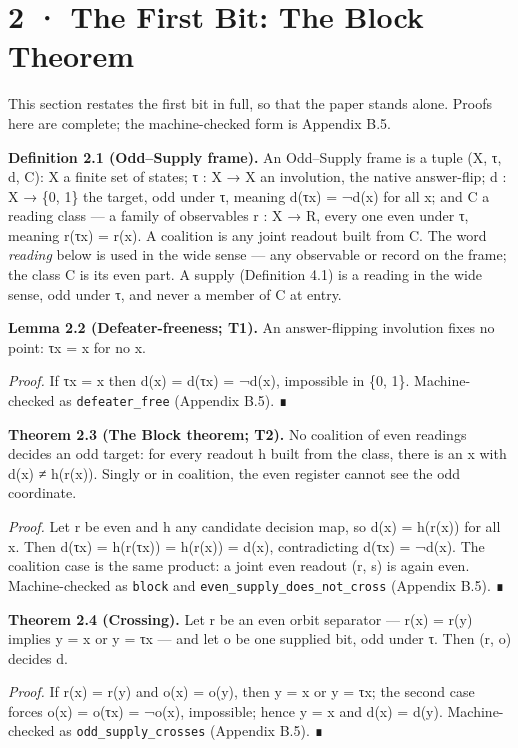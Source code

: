 \documentclass[10pt,twocolumn]{article}
\begin{document}
\section{2 · The First Bit: The Block
Theorem}\label{the-first-bit-the-block-theorem}

This section restates the first bit in full, so that the paper stands
alone. Proofs here are complete; the machine-checked form is Appendix
B.5.

\textbf{Definition 2.1 (Odd--Supply frame).} An Odd--Supply frame is a
tuple (X, τ, d, C): X a finite set of states; τ : X → X an involution,
the native answer-flip; d : X → \{0, 1\} the target, odd under τ,
meaning d(τx) = ¬d(x) for all x; and C a reading class --- a family of
observables r : X → R, every one even under τ, meaning r(τx) = r(x). A
coalition is any joint readout built from C. The word \emph{reading}
below is used in the wide sense --- any observable or record on the
frame; the class C is its even part. A supply (Definition 4.1) is a
reading in the wide sense, odd under τ, and never a member of C at
entry.

\textbf{Lemma 2.2 (Defeater-freeness; T1).} An answer-flipping
involution fixes no point: τx = x for no x.

\emph{Proof.} If τx = x then d(x) = d(τx) = ¬d(x), impossible in \{0,
1\}. Machine-checked as \texttt{defeater\_free} (Appendix B.5). ∎

\textbf{Theorem 2.3 (The Block theorem; T2).} No coalition of even
readings decides an odd target: for every readout h built from the
class, there is an x with d(x) ≠ h(r(x)). Singly or in coalition, the
even register cannot see the odd coordinate.

\emph{Proof.} Let r be even and h any candidate decision map, so d(x) =
h(r(x)) for all x. Then d(τx) = h(r(τx)) = h(r(x)) = d(x), contradicting
d(τx) = ¬d(x). The coalition case is the same product: a joint even
readout (r, s) is again even. Machine-checked as \texttt{block} and
\texttt{even\_supply\_does\_not\_cross} (Appendix B.5). ∎

\textbf{Theorem 2.4 (Crossing).} Let r be an even orbit separator ---
r(x) = r(y) implies y = x or y = τx --- and let o be one supplied bit,
odd under τ. Then (r, o) decides d.

\emph{Proof.} If r(x) = r(y) and o(x) = o(y), then y = x or y = τx; the
second case forces o(x) = o(τx) = ¬o(x), impossible; hence y = x and
d(x) = d(y). Machine-checked as \texttt{odd\_supply\_crosses} (Appendix
B.5). ∎
\end{document}
